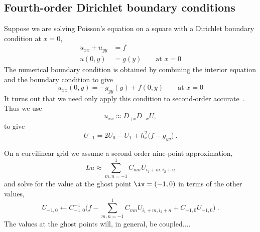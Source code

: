 
\clearpage
\subsection{Fourth-order Dirichlet boundary conditions}

Suppose we are solving Poisson's equation on a square with a Dirichlet boundary 
condition at $x=0$, 
\begin{align*}
   u_{xx} + u_{yy} &= f \\
   u(0,y) & = g(y) \qquad \mbox{at $x=0$}
\end{align*}
The numerical boundary condition is obtained by combining the interior equation and the
boundary condition to give
\[
   u_{xx}(0,y) = - g_{yy}(y) + f(0,y) \qquad \mbox{at $x=0$}
\]
It turns out that we need only apply this condition to second-order accurate~\cite{HKR}.
Thus we use 
\[
 u_{xx} \approx D_{+x}D_{-x} U,
\]
 to give
\[
    U_{-1} = 2 U_{0} - U_{1} + h_x^2\Big( f - g_{yy} \Big) ~.
\]

On a curvilinear grid we assume a second order nine-point approximation,
\[
   Lu  \approx \sum_{m,n=-1}^1 C_{mn} U_{i_1+m,i_2+n}
\]
and solve for the value at the ghost point $\iv=(-1,0)$ in terms of the other values,
\[
    U_{-1,0} \leftarrow C_{-1,0}^{-1} \Big( f - \sum_{m,n=-1}^1 C_{mn} U_{i_1+m,i_2+n} + C_{-1,0}U_{-1,0} \Big) ~.
\]
The values at the ghost points will, in general, be coupled....

